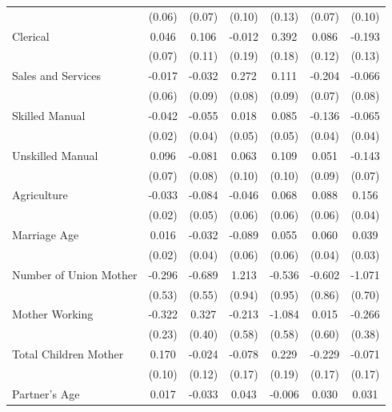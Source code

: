 \begin{longtable}{l*{6}{c}}
                    & (0.06) & (0.07) & (0.10) & (0.13) & (0.07) & (0.10) \\
\hspace{1em}Clerical & 0.046 & 0.106 & -0.012 & 0.392\sym{**} & 0.086 & -0.193 \\
                    & (0.07) & (0.11) & (0.19) & (0.18) & (0.12) & (0.13) \\
\hspace{1em}Sales and Services & -0.017 & -0.032 & 0.272\sym{***} & 0.111 & -0.204\sym{***} & -0.066 \\
                    & (0.06) & (0.09) & (0.08) & (0.09) & (0.07) & (0.08) \\
\hspace{1em}Skilled Manual & -0.042\sym{*} & -0.055 & 0.018 & 0.085 & -0.136\sym{***} & -0.065\sym{*} \\
                    & (0.02) & (0.04) & (0.05) & (0.05) & (0.04) & (0.04) \\
\hspace{1em}Unskilled Manual & 0.096 & -0.081 & 0.063 & 0.109 & 0.051 & -0.143\sym{**} \\
                    & (0.07) & (0.08) & (0.10) & (0.10) & (0.09) & (0.07) \\
\hspace{1em}Agriculture & -0.033 & -0.084\sym{*} & -0.046 & 0.068 & 0.088 & 0.156\sym{***} \\
                    & (0.02) & (0.05) & (0.06) & (0.06) & (0.06) & (0.04) \\
Marriage Age & 0.016 & -0.032 & -0.089 & 0.055 & 0.060 & 0.039 \\
                    & (0.02) & (0.04) & (0.06) & (0.06) & (0.04) & (0.03) \\
Number of Union Mother & -0.296 & -0.689 & 1.213 & -0.536 & -0.602 & -1.071 \\
                    & (0.53) & (0.55) & (0.94) & (0.95) & (0.86) & (0.70) \\
Mother Working & -0.322 & 0.327 & -0.213 & -1.084\sym{*} & 0.015 & -0.266 \\
                    & (0.23) & (0.40) & (0.58) & (0.58) & (0.60) & (0.38) \\
Total Children Mother & 0.170 & -0.024 & -0.078 & 0.229 & -0.229 & -0.071 \\
                    & (0.10) & (0.12) & (0.17) & (0.19) & (0.17) & (0.17) \\
Partner's Age & 0.017 & -0.033\sym{*} & 0.043 & -0.006 & 0.030 & 0.031 \\

\end{longtable}
